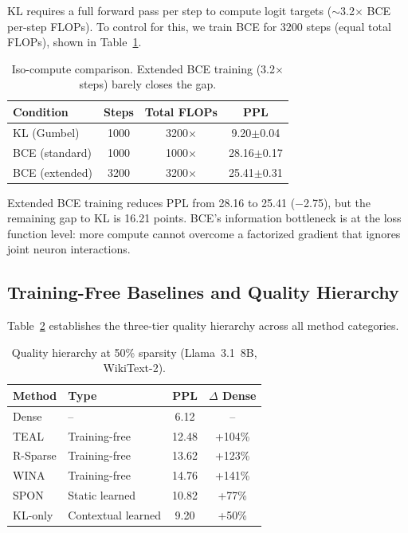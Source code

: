 \documentclass[11pt,a4paper]{article}
\begin{document}
KL requires a full forward pass per step to compute logit targets ($\sim$3.2$\times$ BCE per-step FLOPs).
To control for this, we train BCE for 3200 steps (equal total FLOPs), shown in Table~\ref{tab:isocompute}.

\begin{table}[t]
\centering
\small
\caption{Iso-compute comparison. Extended BCE training (3.2$\times$ steps) barely closes the gap.}
\label{tab:isocompute}
\begin{tabular}{lccc}
\toprule
\textbf{Condition} & \textbf{Steps} & \textbf{Total FLOPs} & \textbf{PPL} \\
\midrule
KL (Gumbel) & 1000 & 3200$\times$ & 9.20\small{$\pm$0.04} \\
BCE (standard) & 1000 & 1000$\times$ & 28.16\small{$\pm$0.17} \\
BCE (extended) & 3200 & 3200$\times$ & 25.41\small{$\pm$0.31} \\
\bottomrule
\end{tabular}
\end{table}

Extended BCE training reduces PPL from 28.16 to 25.41 ($-$2.75), but the remaining gap to KL is 16.21 points.
BCE's information bottleneck is at the loss function level: more compute cannot overcome a factorized gradient that ignores joint neuron interactions.

\subsection{Training-Free Baselines and Quality Hierarchy}
\label{sec:baselines}

Table~\ref{tab:hierarchy} establishes the three-tier quality hierarchy across all method categories.

\begin{table}[t]
\centering
\small
\caption{Quality hierarchy at 50\% sparsity (Llama~3.1~8B, WikiText-2).}
\label{tab:hierarchy}
\begin{tabular}{llcc}
\toprule
\textbf{Method} & \textbf{Type} & \textbf{PPL} & \textbf{$\Delta$ Dense} \\
\midrule
Dense & -- & 6.12 & -- \\
TEAL & Training-free & 12.48 & +104\% \\
R-Sparse & Training-free & 13.62 & +123\% \\
WINA & Training-free & 14.76 & +141\% \\
SPON & Static learned & 10.82 & +77\% \\
KL-only & Contextual learned & 9.20 & +50\% \\
\bottomrule
\end{tabular}
\end{table}
\end{document}
